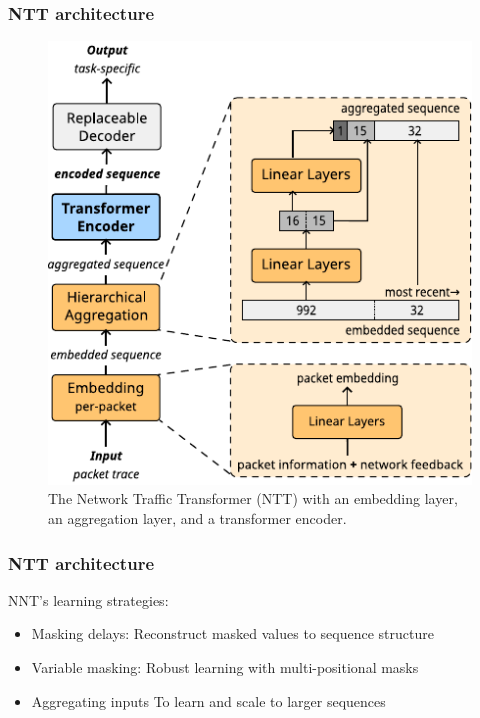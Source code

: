 \documentclass{beamer}
\begin{document}
\begin{frame}
\frametitle{NTT architecture}

\begin{figure}[!hbt]
  \begin{center}
    \includegraphics[scale=0.8]{figures/architecture_ntt.pdf}
    \caption{The Network Traffic Transformer (NTT) with
        an embedding layer, %
        an aggregation layer, and
        a transformer encoder.}
    \label{fig:ntt}
  \end{center}
\end{figure}
\end{frame}

\begin{frame}
\frametitle{NTT architecture}

NNT's learning strategies: 
\pause 
\begin{itemize}
    \item<1-> \alert{Masking delays:} Reconstruct masked values to sequence structure
    \item<1-> \alert{Variable masking:} Robust learning with multi-positional masks
    \item<1-> \alert{Aggregating inputs} To learn and scale to larger sequences
\end{itemize}
\end{frame}
\end{document}
